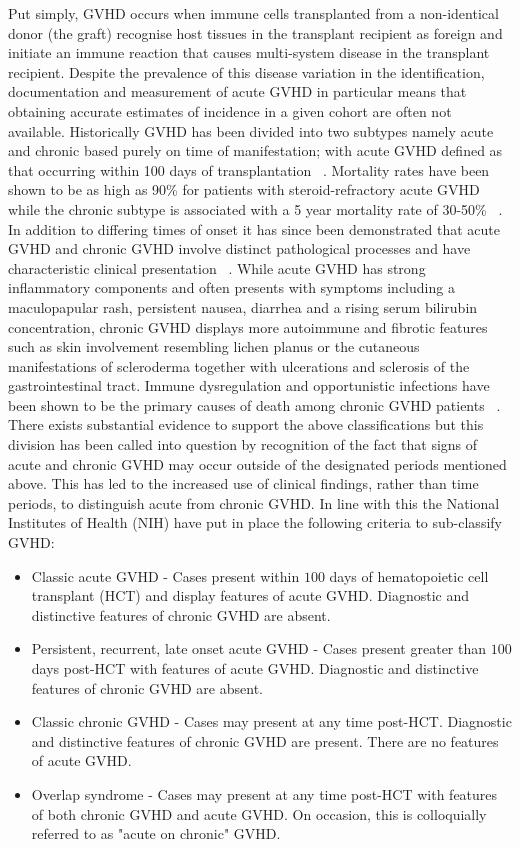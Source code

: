 Put simply, GVHD occurs when immune cells transplanted from a non-identical donor (the graft) recognise host tissues in the transplant recipient as foreign and initiate an immune reaction that causes multi-system disease in the transplant recipient. Despite the prevalence of this disease variation in the identification, documentation and measurement of acute GVHD in particular means that obtaining accurate estimates of incidence in a given cohort are often not available. Historically GVHD has been divided into two subtypes namely acute and chronic based purely on time of manifestation; with acute GVHD defined as that occurring within 100 days of transplantation ~\autocite{Buz2008}. Mortality rates have been shown to be as high as 90\% for patients with steroid-refractory acute GVHD while the chronic subtype is associated with a 5 year mortality rate of 30-50\% ~\autocite{Bla2012}. In addition to differing times of onset it has since been demonstrated that acute GVHD and chronic GVHD involve distinct pathological processes and have characteristic clinical presentation ~\autocite{Bla2012}. While acute GVHD has strong inflammatory components and often presents with symptoms including a maculopapular rash, persistent nausea, diarrhea and a rising serum bilirubin concentration, chronic GVHD displays more autoimmune and fibrotic features such as skin involvement resembling lichen planus or the cutaneous manifestations of scleroderma together with ulcerations and sclerosis of the gastrointestinal tract. Immune dysregulation and opportunistic infections have been shown to be the primary causes of death among chronic GVHD patients ~\autocite{Bla2012}. There exists substantial evidence to support the above classifications but this division has been called into question by recognition of the fact that signs of acute and chronic GVHD may occur outside of the designated periods mentioned above. This has led to the increased use of clinical findings, rather than time periods, to distinguish acute from chronic GVHD. In line with this the National Institutes of Health (NIH) have put in place the following criteria to sub-classify GVHD: 
\begin{itemize}
    \item Classic acute GVHD - Cases present within $100$ days of hematopoietic cell transplant (HCT) and display features of acute GVHD. Diagnostic and distinctive features of chronic GVHD are absent.
    \item Persistent, recurrent, late onset acute GVHD - Cases present greater than $100$ days post-HCT with features of acute GVHD. Diagnostic and distinctive features of chronic GVHD are absent.
    \item Classic chronic GVHD - Cases may present at any time post-HCT. Diagnostic and distinctive features of chronic GVHD are present. There are no features of acute GVHD.
    \item Overlap syndrome - Cases may present at any time post-HCT with features of both chronic GVHD and acute GVHD. On occasion, this is colloquially referred to as "acute on chronic" GVHD.
\end{itemize}

